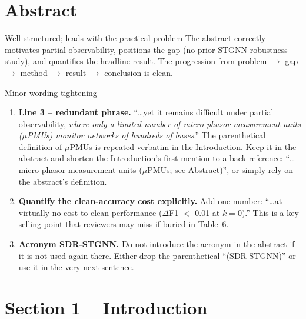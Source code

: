 \documentclass[11pt,a4paper]{article}
\begin{document}
\section{Abstract}

\begin{okbox}{Well-structured; leads with the practical problem}
The abstract correctly motivates partial observability, positions the gap
(no prior STGNN robustness study), and quantifies the headline result. The
progression from problem $\to$ gap $\to$ method $\to$ result $\to$ conclusion is
clean.
\end{okbox}

\begin{suggestbox}{Minor wording tightening}
\begin{enumerate}[leftmargin=*,label=\arabic*.]
  \item \textbf{Line 3 -- redundant phrase.}
    ``\ldots yet it remains difficult under partial observability, \emph{where
    only a limited number of micro-phasor measurement units ($\mu$PMUs) monitor
    networks of hundreds of buses}.'' The parenthetical definition of
    $\mu$PMUs is repeated verbatim in the Introduction. Keep it in the abstract
    and shorten the Introduction's first mention to a back-reference:
    ``\ldots micro-phasor measurement units ($\mu$PMUs; see Abstract)'',
    or simply rely on the abstract's definition.
  \item \textbf{Quantify the clean-accuracy cost explicitly.}
    Add one number: ``\ldots at virtually no cost to clean performance
    ($\Delta$F1 $<$ 0.01 at $k{=}0$).'' This is a key selling point that
    reviewers may miss if buried in Table~6.
  \item \textbf{Acronym SDR-STGNN.} Do not introduce the acronym in the
    abstract if it is not used again there. Either drop the parenthetical
    ``(SDR-STGNN)'' or use it in the very next sentence.
\end{enumerate}
\end{suggestbox}

\section{Section 1 -- Introduction}
\end{document}

